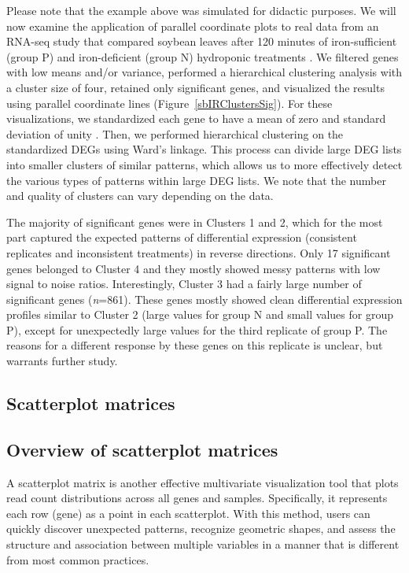 \documentclass{bmcart}
\begin{document}
\begin{linenumbers}
\begin{doublespacing}
Please note that the example above was simulated for didactic purposes. We will now examine the application of parallel coordinate plots to real data from an RNA-seq study that compared soybean leaves after 120 minutes of iron-sufficient (group P) and iron-deficient (group N) hydroponic treatments \cite{Lauter16}. We filtered genes with low means and/or variance, performed a hierarchical clustering analysis with a cluster size of four, retained only significant genes, and visualized the results using parallel coordinate lines (Figure~\ref{sbIRClustersSig}). For these visualizations, we standardized each gene to have a mean of zero and standard deviation of unity \cite{Chandrasekhar, deSouto}. Then, we performed hierarchical clustering on the standardized DEGs using Ward's linkage. This process can divide large DEG lists into smaller clusters of similar patterns, which allows us to more effectively detect the various types of patterns within large DEG lists. We note that the number and quality of clusters can vary depending on the data.

The majority of significant genes were in Clusters 1 and 2, which for the most part captured the expected patterns of differential expression (consistent replicates and inconsistent treatments) in reverse directions. Only 17 significant genes belonged to Cluster 4 and they mostly showed messy patterns with low signal to noise ratios. Interestingly, Cluster 3 had a fairly large number of significant genes (\textit{n}=861). These genes mostly showed clean differential expression profiles similar to Cluster 2 (large values for group N and small values for group P), except for unexpectedly large values for the third replicate of group P. The reasons for a different response by these genes on this replicate is unclear, but warrants further study.

\subsection*{Scatterplot matrices}

\subsection*{Overview of scatterplot matrices}

A scatterplot matrix is another effective multivariate visualization tool that plots read count distributions across all genes and samples. Specifically, it represents each row (gene) as a point in each scatterplot. With this method, users can quickly discover unexpected patterns, recognize geometric shapes, and assess the structure and association between multiple variables in a manner that is different from most common practices.


\end{doublespacing}
\end{linenumbers}
\end{document}
